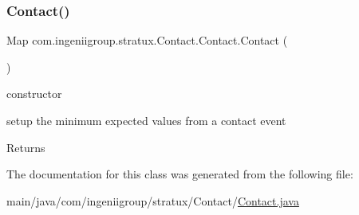 \subsubsection{\texorpdfstring{Contact()}{Contact()}}
{\footnotesize\ttfamily Map com.\+ingeniigroup.\+stratux.\+Contact.\+Contact.\+Contact (\begin{DoxyParamCaption}{ }\end{DoxyParamCaption})}

constructor

setup the minimum expected values from a contact event \begin{DoxyReturn}{Returns}

\end{DoxyReturn}


The documentation for this class was generated from the following file\+:\begin{DoxyCompactItemize}
\item 
main/java/com/ingeniigroup/stratux/\+Contact/\hyperlink{_contact_8java}{Contact.\+java}\end{DoxyCompactItemize}
